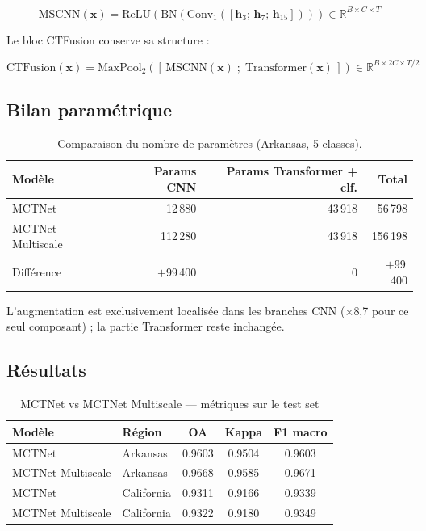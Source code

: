 \begin{equation}
  \text{MSCNN}(\mathbf{x})
  = \text{ReLU}\!\left(\text{BN}\!\left(
      \text{Conv}_{1}\!\left([\mathbf{h}_3;\,\mathbf{h}_7;\,\mathbf{h}_{15}]\right)
    \right)\right)
  \in \mathbb{R}^{B \times C \times T}
\end{equation}

Le bloc CTFusion conserve sa structure :

\begin{equation}
  \text{CTFusion}(\mathbf{x})
  = \text{MaxPool}_2\!\left(
      [\,\text{MSCNN}(\mathbf{x})\;;\;\text{Transformer}(\mathbf{x})\,]
    \right)
  \in \mathbb{R}^{B \times 2C \times T/2}
\end{equation}

\subsection{Bilan paramétrique}
\label{subsec:ms_params}

\begin{table}[H]
\centering
\caption{Comparaison du nombre de paramètres (Arkansas, 5 classes).}
\label{tab:ms_params}
\begin{tabular}{lrrr}
\toprule
\textbf{Modèle} & \textbf{Params CNN} & \textbf{Params Transformer + clf.} & \textbf{Total} \\
\midrule
MCTNet \cite{wang2024}  & 12\,880    & 43\,918 & 56\,798  \\
MCTNet Multiscale       & 112\,280   & 43\,918 & 156\,198 \\
\midrule
Différence              & $+$99\,400 & 0       & $+$99\,400 \\
\bottomrule
\end{tabular}
\end{table}

L'augmentation est exclusivement localisée dans les branches CNN
($\times$8,7 pour ce seul composant) ; la partie Transformer reste inchangée.

\subsection{Résultats}

\begin{table}[H]
\centering
\caption{MCTNet vs MCTNet Multiscale — métriques sur le test set}
\label{tab:resultats_multiscale}
\begin{tabular}{llccc}
\toprule
\textbf{Modèle} & \textbf{Région} & \textbf{OA} & \textbf{Kappa} & \textbf{F1 macro} \\
\midrule
MCTNet            & Arkansas   & 0.9603 & 0.9504 & 0.9603 \\
MCTNet Multiscale & Arkansas   & 0.9668 & 0.9585 & 0.9671 \\
\midrule
MCTNet            & California & 0.9311 & 0.9166 & 0.9339 \\
MCTNet Multiscale & California & 0.9322 & 0.9180 & 0.9349 \\
\bottomrule
\end{tabular}
\end{table}

